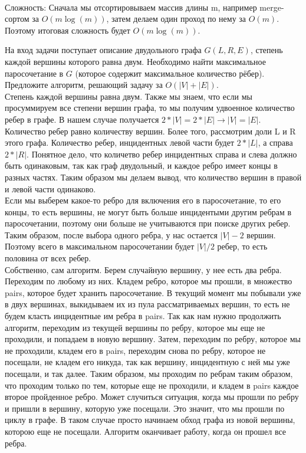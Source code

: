\documentclass[12pt]{extreport}
\theoremstyle{definiton}
\theoremstyle{definition}
\theoremstyle{definition}
\begin{document}
	\\Сложность: Сначала мы отсортировываем массив длины m, например merge-сортом за $O(m\log(m))$, затем делаем один проход по нему за $O(m)$. Поэтому итоговая сложность будет $O(m \log(m))$.



	\Pr[3] На вход задачи поступает описание двудольного графа $G(L,R,E)$, степень каждой вершины которого равна двум. Необходимо найти максимальное паросочетание в $G$ (которое содержит максимальное количество рёбер). Предложите алгоритм, решающий задачу за $O(|V| +|E|)$.
	\newline
	\\ Степень каждой вершины равна двум. Также мы знаем, что если мы просуммируем все степени вершин графа, то мы получим удвоенное количество ребер в графе. В нашем случае получается $2*|V|=2*|E|\to |V|=|E|$. Количество ребер равно количеству вершин. Более того, рассмотрим доли L и R этого графа. Количество ребер, инцидентных левой части будет $2*|L|$, а справа $2*|R|$. Понятное дело, что количетво ребер инцидентных справа и слева должно быть одинаковым, так как граф двудольный, и каждое ребро имеет концы в разных частях. Таким образом мы делаем вывод, что количество вершин в правой и левой части одинаково.
	\\Если мы выберем какое-то ребро для включения его в паросочетание, то его концы, то есть вершины, не могут быть больше инцидентыми другим ребрам в паросочетании, поэтому они больше не учитываются при поиске других ребер. Таким образом, после выбора одного ребра, у нас остается $|V|-2$ вершин. Поэтому всего в максимальном паросочетании будет $|V|/2$ ребер, то есть половина от всех ребер.
	\\Собственно, сам алгоритм. Берем случайную вершину, у нее есть два ребра. Переходим по любому из них. Кладем ребро, которое мы прошли, в множество pairs, которое будет хранить паросочетание. В текущий момент мы побывали уже в двух вершинах, выкидываем их из пула рассматриваемых вершин, то есть не будем класть инцидентные им ребра в pairs. Так как нам нужно продолжить алгоритм, переходим из текущей вершины по ребру, которое мы еще не проходили, и попадаем в новую вершину. Затем, переходим по ребру, которое мы не проходили, кладем его в pairs, переходим снова по ребру, которое не посещали, не кладем его никуда, так как вершину, инцидентную с ней мы уже посещали, и так далее. Таким образом, мы проходим по ребрам таким образом, что проходим только по тем, которые еще не проходили, и кладем в pairs каждое второе пройденное ребро. Может случиться ситуация, когда мы прошли по ребру и пришли в вершину, которую уже посещали. Это значит, что мы прошли по циклу в графе. В таком случае просто начинаем обход графа из новой вершины, которою еще не посещали. Алгоритм оканчивает работу, когда он прошел все ребра.
\end{document}
